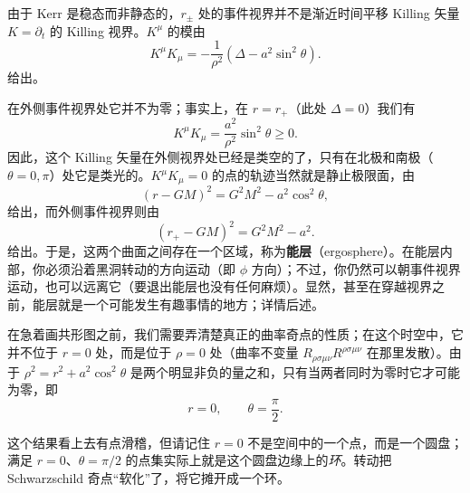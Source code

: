 由于 Kerr 是稳态而非静态的，$r_{\pm}$ 处的事件视界并不是渐近时间平移 Killing 矢量 $K=\partial_t$ 的 Killing 视界。$K^{\mu}$ 的模由
\begin{equation*}
K^{\mu}K_{\mu} = -\frac{1}{\rho^{2}}\left(\Delta - a^{2}\sin^{2}\theta\right).
\tag{6.83}
\end{equation*}
给出。



在外侧事件视界处它并不为零；事实上，在 $r=r_{+}$（此处 $\Delta=0$）我们有
\begin{equation*}
K^{\mu}K_{\mu} = \frac{a^{2}}{\rho^{2}}\sin^{2}\theta \geq 0.
\tag{6.84}
\end{equation*}
因此，这个 Killing 矢量在外侧视界处已经是类空的了，只有在北极和南极（$\theta=0,\pi$）处它是类光的。$K^{\mu}K_{\mu}=0$ 的点的轨迹当然就是静止极限面，由
\begin{equation*}
(r-GM)^{2} = G^{2}M^{2} - a^{2}\cos^{2}\theta,
\tag{6.85}
\end{equation*}
给出，而外侧事件视界则由
\begin{equation*}
(r_{+}-GM)^{2} = G^{2}M^{2} - a^{2}.
\tag{6.86}
\end{equation*}
给出。于是，这两个曲面之间存在一个区域，称为\textbf{能层}（ergosphere）。在能层内部，你必须沿着黑洞转动的方向运动（即 $\phi$ 方向）；不过，你仍然可以朝事件视界运动，也可以远离它（要退出能层也没有任何麻烦）。显然，甚至在穿越视界之前，能层就是一个可能发生有趣事情的地方；详情后述。

在急着画共形图之前，我们需要弄清楚真正的曲率奇点的性质；在这个时空中，它并不位于 $r=0$ 处，而是位于 $\rho=0$ 处（曲率不变量 $R_{\rho\sigma\mu\nu}R^{\rho\sigma\mu\nu}$ 在那里发散）。由于 $\rho^{2}=r^{2}+a^{2}\cos^{2}\theta$ 是两个明显非负的量之和，只有当两者同时为零时它才可能为零，即
\begin{equation*}
r = 0,\qquad \theta = \frac{\pi}{2}.
\tag{6.87}
\end{equation*}


这个结果看上去有点滑稽，但请记住 $r=0$ 不是空间中的一个点，而是一个圆盘；满足 $r=0$、$\theta=\pi/2$ 的点集实际上就是这个圆盘边缘上的\emph{环}。转动把 Schwarzschild 奇点“软化”了，将它摊开成一个环。

